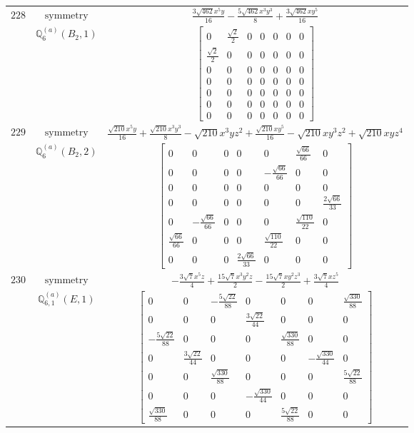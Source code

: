 \documentclass[fleqn,8pt,landscape]{jsarticle}
\begin{document}
\begin{longtable}{ccc}
$ 228 $ & $ \text{symmetry} $ & $ \frac{3 \sqrt{462} x^{5} y}{16} - \frac{5 \sqrt{462} x^{3} y^{3}}{8} + \frac{3 \sqrt{462} x y^{5}}{16} $ \\
$  $ & $ \mathbb{Q}_{6}^{(a)}(B_{2},1) $ & $ \begin{bmatrix} 0 & \frac{\sqrt{2}}{2} & 0 & 0 & 0 & 0 & 0 \\ \frac{\sqrt{2}}{2} & 0 & 0 & 0 & 0 & 0 & 0 \\ 0 & 0 & 0 & 0 & 0 & 0 & 0 \\ 0 & 0 & 0 & 0 & 0 & 0 & 0 \\ 0 & 0 & 0 & 0 & 0 & 0 & 0 \\ 0 & 0 & 0 & 0 & 0 & 0 & 0 \\ 0 & 0 & 0 & 0 & 0 & 0 & 0 \end{bmatrix} $ \\ \hline
$ 229 $ & $ \text{symmetry} $ & $ \frac{\sqrt{210} x^{5} y}{16} + \frac{\sqrt{210} x^{3} y^{3}}{8} - \sqrt{210} x^{3} y z^{2} + \frac{\sqrt{210} x y^{5}}{16} - \sqrt{210} x y^{3} z^{2} + \sqrt{210} x y z^{4} $ \\
$  $ & $ \mathbb{Q}_{6}^{(a)}(B_{2},2) $ & $ \begin{bmatrix} 0 & 0 & 0 & 0 & 0 & \frac{\sqrt{66}}{66} & 0 \\ 0 & 0 & 0 & 0 & - \frac{\sqrt{66}}{66} & 0 & 0 \\ 0 & 0 & 0 & 0 & 0 & 0 & 0 \\ 0 & 0 & 0 & 0 & 0 & 0 & \frac{2 \sqrt{66}}{33} \\ 0 & - \frac{\sqrt{66}}{66} & 0 & 0 & 0 & \frac{\sqrt{110}}{22} & 0 \\ \frac{\sqrt{66}}{66} & 0 & 0 & 0 & \frac{\sqrt{110}}{22} & 0 & 0 \\ 0 & 0 & 0 & \frac{2 \sqrt{66}}{33} & 0 & 0 & 0 \end{bmatrix} $ \\ \hline
$ 230 $ & $ \text{symmetry} $ & $ - \frac{3 \sqrt{7} x^{5} z}{4} + \frac{15 \sqrt{7} x^{3} y^{2} z}{2} - \frac{15 \sqrt{7} x y^{2} z^{3}}{2} + \frac{3 \sqrt{7} x z^{5}}{4} $ \\
$  $ & $ \mathbb{Q}_{6,1}^{(a)}(E,1) $ & $ \begin{bmatrix} 0 & 0 & - \frac{5 \sqrt{22}}{88} & 0 & 0 & 0 & \frac{\sqrt{330}}{88} \\ 0 & 0 & 0 & \frac{3 \sqrt{22}}{44} & 0 & 0 & 0 \\ - \frac{5 \sqrt{22}}{88} & 0 & 0 & 0 & \frac{\sqrt{330}}{88} & 0 & 0 \\ 0 & \frac{3 \sqrt{22}}{44} & 0 & 0 & 0 & - \frac{\sqrt{330}}{44} & 0 \\ 0 & 0 & \frac{\sqrt{330}}{88} & 0 & 0 & 0 & \frac{5 \sqrt{22}}{88} \\ 0 & 0 & 0 & - \frac{\sqrt{330}}{44} & 0 & 0 & 0 \\ \frac{\sqrt{330}}{88} & 0 & 0 & 0 & \frac{5 \sqrt{22}}{88} & 0 & 0 \end{bmatrix} $ \\ \hline

\end{longtable}
\end{document}
